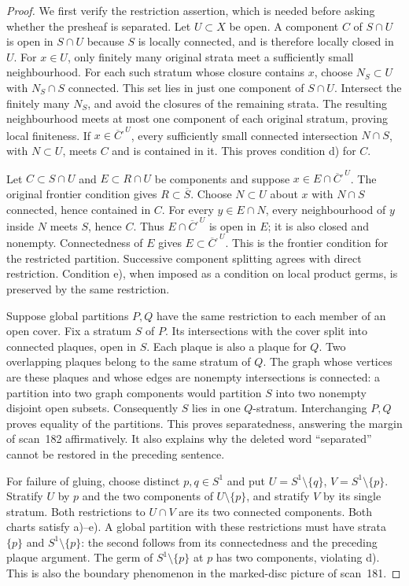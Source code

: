 \begin{proof}
We first verify the restriction assertion, which is needed before asking
whether the presheaf is separated. Let $U\subset X$ be open. A component
$C$ of $S\cap U$ is open in $S\cap U$ because $S$ is locally connected,
and is therefore locally closed in $U$. For $x\in U$, only finitely many
original strata meet a sufficiently small neighbourhood. For each such
stratum whose closure contains $x$, choose $N_S\subset U$ with
$N_S\cap S$ connected. This set lies in just one component of $S\cap U$.
Intersect the finitely many $N_S$, and avoid the closures of the remaining
strata. The resulting neighbourhood meets at most one component of each
original stratum, proving local finiteness. If $x\in\overline C^{,U}$,
every sufficiently small connected intersection $N\cap S$, with
$N\subset U$, meets $C$ and is contained in it. This proves condition d)
for $C$.

Let $C\subset S\cap U$ and $E\subset R\cap U$ be components and suppose
$x\in E\cap\overline C^{,U}$. The original frontier condition gives
$R\subset\overline S$. Choose $N\subset U$ about $x$ with $N\cap S$
connected, hence contained in $C$. For every $y\in E\cap N$, every
neighbourhood of $y$ inside $N$ meets $S$, hence $C$. Thus
$E\cap\overline C^{,U}$ is open in $E$; it is also closed and nonempty.
Connectedness of $E$ gives $E\subset\overline C^{,U}$. This is the
frontier condition for the restricted partition. Successive component
splitting agrees with direct restriction. Condition e), when imposed as
a condition on local product germs, is preserved by the same restriction.

Suppose global partitions $P,Q$ have the same restriction to each member
of an open cover. Fix a stratum $S$ of $P$. Its intersections with the
cover split into connected plaques, open in $S$. Each plaque is also a
plaque for $Q$. Two overlapping plaques belong to the same stratum of
$Q$. The graph whose vertices are these plaques and whose edges are
nonempty intersections is connected: a partition into two graph
components would partition $S$ into two nonempty disjoint open subsets.
Consequently $S$ lies in one $Q$-stratum. Interchanging $P,Q$ proves
equality of the partitions. This proves separatedness, answering the
margin of scan~182 affirmatively. It also explains why the deleted word
``separated'' cannot be restored in the preceding sentence.

For failure of gluing, choose distinct $p,q\in S^1$ and put
$U=S^1\setminus\{q\}$, $V=S^1\setminus\{p\}$. Stratify $U$ by $p$ and
the two components of $U\setminus\{p\}$, and stratify $V$ by its single
stratum. Both restrictions to $U\cap V$ are its two connected
components. Both charts satisfy a)--e). A global partition with these
restrictions must have strata $\{p\}$ and $S^1\setminus\{p\}$: the
second follows from its connectedness and the preceding plaque argument.
The germ of $S^1\setminus\{p\}$ at $p$ has two components, violating d).
This is also the boundary phenomenon in the marked-disc picture of
scan~181.


\end{proof}
